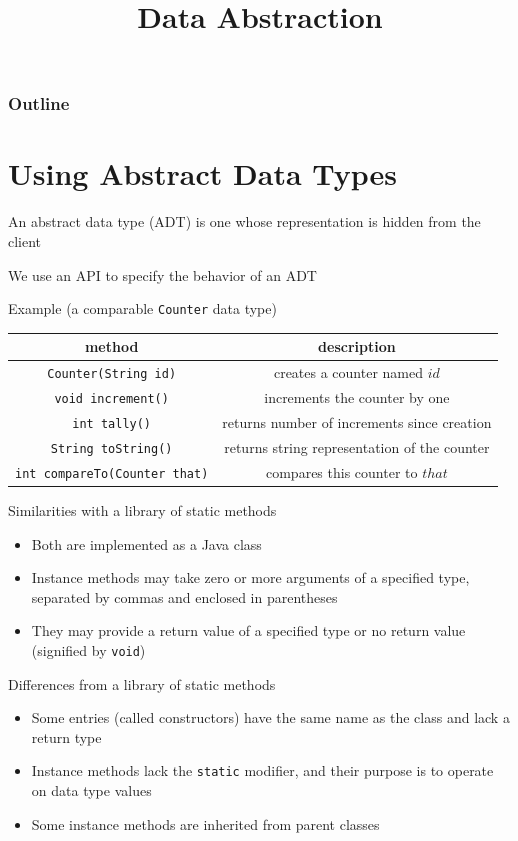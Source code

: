 \documentclass[8pt,a4paper,compress]{beamer}
\title{Data Abstraction}
\date{}
\begin{document}
\begin{frame}
\vfill
\titlepage
\end{frame}

\begin{frame}
\frametitle{Outline}
\tableofcontents
\end{frame}

\section{Using Abstract Data Types}
\begin{frame}[fragile]
An abstract data type (ADT) is one whose representation is hidden from the client

\bigskip

We use an API to specify the behavior of an ADT

\bigskip

Example (a comparable \lstinline{Counter} data type)
\begin{center}
\begin{tabular}{cc}
method & description \\ \hline
\lstinline$Counter(String id)$ & creates a counter named $id$ \\
\lstinline$void increment()$ & increments the counter by one \\
\lstinline$int tally()$ & returns number of increments since creation \\
\lstinline$String toString()$ & returns string representation of the counter \\
\lstinline$int compareTo(Counter that)$ & compares this counter to $that$
\end{tabular} 
\end{center}
\end{frame}

\begin{frame}[fragile]
Similarities with a library of static methods
\begin{itemize}
\item Both are implemented as a Java class
\item Instance methods may take zero or more arguments of a specified type, separated by commas and enclosed in parentheses
\item They may provide a return value of a specified type or no return value (signified by \lstinline{void})
\end{itemize}

\bigskip

Differences from a library of static methods
\begin{itemize}
\item Some entries (called constructors) have the same name as the class and lack a return type
\item Instance methods lack the \lstinline{static} modifier, and their purpose is to operate on data type values
\item Some instance methods are inherited from parent classes
\end{itemize}
\end{frame}
\end{document}

